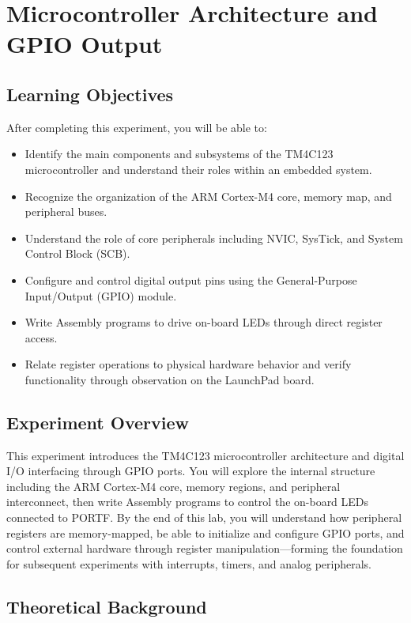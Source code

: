 \chapter{Microcontroller Architecture and GPIO Output}

\section*{Learning Objectives}
After completing this experiment, you will be able to:
\begin{itemize}[nosep]
  \item Identify the main components and subsystems of the TM4C123 microcontroller and understand their roles within an embedded system.
  \item Recognize the organization of the ARM Cortex-M4 core, memory map, and peripheral buses.
  \item Understand the role of core peripherals including NVIC, SysTick, and System Control Block (SCB).
  \item Configure and control digital output pins using the General-Purpose Input/Output (GPIO) module.
  \item Write Assembly programs to drive on-board LEDs through direct register access.
  \item Relate register operations to physical hardware behavior and verify functionality through observation on the LaunchPad board.
\end{itemize}

\section*{Experiment Overview}
This experiment introduces the TM4C123 microcontroller architecture and digital I/O interfacing through GPIO ports. You will explore the internal structure including the ARM Cortex-M4 core, memory regions, and peripheral interconnect, then write Assembly programs to control the on-board LEDs connected to PORTF. By the end of this lab, you will understand how peripheral registers are memory-mapped, be able to initialize and configure GPIO ports, and control external hardware through register manipulation—forming the foundation for subsequent experiments with interrupts, timers, and analog peripherals.

\newpage


\section{Theoretical Background}

